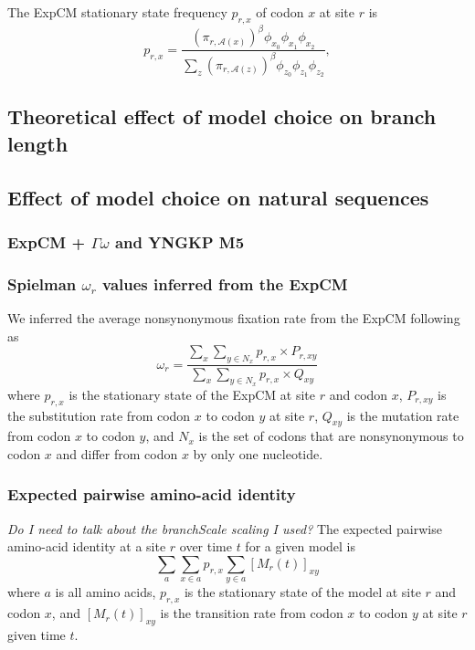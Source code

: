 \documentclass[11pt]{article}
\begin{document}
The ExpCM stationary state frequency $p_{r,x}$ of codon $x$ at site $r$ is~\citep{bloom2017identification} 
\begin{equation}
\label{eq:p_rx}
p_{r,x} = \frac{\left(\pi_{r,\mathcal{A}\left(x\right)}\right)^{\beta} \phi_{x_0} \phi_{x_1} \phi_{x_2}}{\sum_z \left(\pi_{r,\mathcal{A}\left(z\right)}\right)^{\beta} \phi_{z_0} \phi_{z_1} \phi_{z_2}},
\end{equation}
\subsection*{Theoretical effect of model choice on branch length}
\subsection*{Effect of model choice on natural sequences}

\subsubsection*{ExpCM + $\Gamma\omega$ and YNGKP M5}


\subsubsection*{Spielman $\omega_{r}$ values inferred from the ExpCM} 
We inferred the average nonsynonymous fixation rate from the ExpCM following~\citet{spielman2015relationship} as 
\begin{equation}
\label{eq:w_r}
\omega_{r} = \frac{\sum_{x} \sum_{y \in N_x} {p_{r,x} \times P_{r,xy}}}{\sum_{x} \sum_{y \in N_x} {p_{r,x} \times Q_{xy}}}
\end{equation}
where $p_{r,x}$ is the stationary state of the ExpCM at site $r$ and codon $x$, $P_{r,xy}$ is the substitution rate from codon $x$ to codon $y$ at site $r$, $Q_{xy}$ is the mutation rate from codon $x$ to codon $y$, and $N_x$ is the set of codons that are nonsynonymous to codon $x$ and differ from codon $x$ by only one nucleotide. 

\subsubsection*{Expected pairwise amino-acid identity}
\textit{Do I need to talk about the branchScale scaling I used?}
The expected pairwise amino-acid identity at a site $r$ over time $t$ for a given model is 
\begin{equation}
\label{eq:f}
\sum_a \sum_{x \in a} p_{r,x} \sum_{y \in a} [M_{r}\left(t\right)]_{xy}
\end{equation}
where $a$ is all amino acids, $p_{r,x}$ is the stationary state of the model at site $r$ and codon $x$, and $[M_{r}\left(t\right)]_{xy}$ is the transition rate from codon $x$ to codon $y$ at site $r$ given time $t$. 
\end{document}
